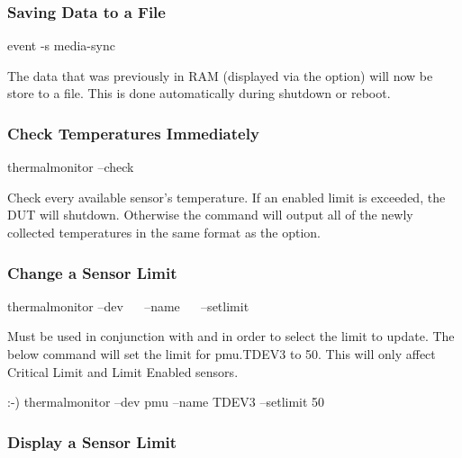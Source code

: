 \subsubsection{Saving Data to a File}
\label{sec:SavingData}

\begin{CommandLine}
event -s media-sync
\end{CommandLine}

The data that was previously in RAM (displayed via the  option)
will now be store to a file. This is done automatically during shutdown or
reboot.

\subsubsection{Check Temperatures Immediately}
\label{sec:ManualTempCheck}

\begin{CommandLine}
thermalmonitor --check
\end{CommandLine}

Check every available sensor's temperature. If an enabled limit is exceeded,
the DUT will shutdown. Otherwise the command will output all of the newly
collected temperatures in the same format as the  option.

\subsubsection{Change a Sensor Limit}
\label{sec:ChangingLimits}

\begin{CommandLine}
thermalmonitor --dev ~~ --name ~~ --setlimit
\end{CommandLine}

Must be used in conjunction with  and  in order to select the limit
to update. The below command will set the limit for pmu.TDEV3 to 50. This will only affect Critical
Limit and Limit Enabled sensors.

\begin{LogExcerpt}
:-) thermalmonitor --dev pmu --name TDEV3 --setlimit 50
\end{LogExcerpt}

\subsubsection{Display a Sensor Limit}

